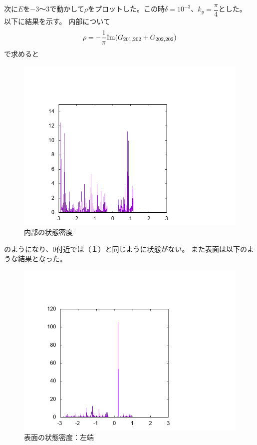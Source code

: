 \documentclass{jarticle}
\begin{document}
次に$E$を$-3$〜$3$で動かして$\rho$をプロットした。この時$\delta=10^{-3}$、$k_y=\dfrac{\pi}{4}$とした。
以下に結果を示す。
内部について
\begin{align}
\rho=-\dfrac{1}{\pi}{\rm Im}(G_{201,202}+G_{202,202})
\end{align}
で求めると
\begin{figure}[H]
	\centering
	\includegraphics[scale=0.7]{../../20/KS/20-3/graph/data.png}
	\caption{内部の状態密度}
\end{figure}
のようになり、$0$付近では（１）と同じように状態がない。
また表面は以下のような結果となった。
\begin{figure}[H]
	\centering
	\includegraphics[scale=0.7]{../../20/KS/20-4/graph/data.png}
	\caption{表面の状態密度：左端}
\end{figure}
\end{document}
